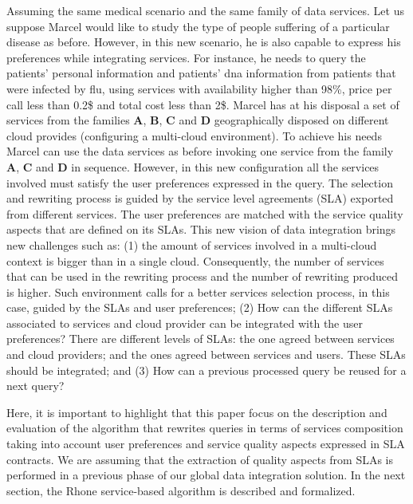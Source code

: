 Assuming the same medical scenario and the same family of data services.
Let us suppose Marcel would like to study the type of people suffering of a particular disease as before. However, in this new scenario, he is also capable to express his preferences while integrating services. For instance, he needs to query the patients' personal information and patients' dna information from patients that were infected by flu, using services with availability higher than 98\%, price per call less than 0.2\$ and total cost less than 2\$. Marcel has at his disposal a set of services from the families \textbf{A}, \textbf{B}, \textbf{C} and \textbf{D} geographically disposed on different cloud provides (configuring a multi-cloud environment). 
To achieve his needs Marcel can use the data services as before invoking one service from the family \textbf{A}, \textbf{C} and \textbf{D} in sequence. However, in this new configuration all the services involved must satisfy the user preferences expressed in the query. The selection and rewriting process is guided by the service level agreements (SLA) exported from different services. The user preferences are matched with the service quality aspects that are defined on its SLAs. 
This new vision of data integration brings new challenges such as: 
(1) the amount of services involved in a multi-cloud context is bigger than in a single cloud. Consequently, the number of services that can be used in the rewriting process and the number of rewriting produced is higher. Such environment calls for a better services selection process, in this case, guided by the SLAs and user preferences;
(2) How can the different SLAs associated to services and cloud provider can be integrated with the user preferences? There are different levels of SLAs: the one agreed between services and cloud providers; and the ones agreed between services and users. These SLAs should be integrated; and 
(3) How can a previous processed query be reused for a next query?

Here, it is important to highlight that this paper focus on the description and evaluation of the algorithm that rewrites queries in terms of services composition taking into account user preferences and service quality aspects expressed in SLA contracts. We are assuming that the extraction of quality aspects from SLAs is performed in a previous phase of our global data integration solution.
In the next section, the Rhone service-based algorithm is described and formalized.